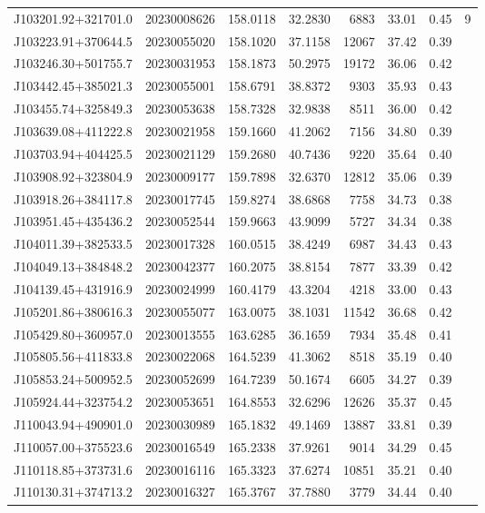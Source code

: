 \documentclass{article}
\begin{document}
\begin {longtable}{|l|l|r|r|r|r|r|l|}
 J103201.92+321701.0&  20230008626&  158.0118&   32.2830&  6883& 33.01& 0.45&9\\
 J103223.91+370644.5&  20230055020&  158.1020&   37.1158& 12067& 37.42& 0.39&\\
 J103246.30+501755.7&  20230031953&  158.1873&   50.2975& 19172& 36.06& 0.42&\\
 J103442.45+385021.3&  20230055001&  158.6791&   38.8372&  9303& 35.93& 0.43&\\
 J103455.74+325849.3&  20230053638&  158.7328&   32.9838&  8511& 36.00& 0.42&\\
 J103639.08+411222.8&  20230021958&  159.1660&   41.2062&  7156& 34.80& 0.39&\\
 J103703.94+404425.5&  20230021129&  159.2680&   40.7436&  9220& 35.64& 0.40&\\
 J103908.92+323804.9&  20230009177&  159.7898&   32.6370& 12812& 35.06& 0.39&\\
 J103918.26+384117.8&  20230017745&  159.8274&   38.6868&  7758& 34.73& 0.38&\\
 J103951.45+435436.2&  20230052544&  159.9663&   43.9099&  5727& 34.34& 0.38&\\
 J104011.39+382533.5&  20230017328&  160.0515&   38.4249&  6987& 34.43& 0.43&\\
 J104049.13+384848.2&  20230042377&  160.2075&   38.8154&  7877& 33.39& 0.42&\\
 J104139.45+431916.9&  20230024999&  160.4179&   43.3204&  4218& 33.00& 0.43&\\
 J105201.86+380616.3&  20230055077&  163.0075&   38.1031& 11542& 36.68& 0.42&\\
 J105429.80+360957.0&  20230013555&  163.6285&   36.1659&  7934& 35.48& 0.41&\\
 J105805.56+411833.8&  20230022068&  164.5239&   41.3062&  8518& 35.19& 0.40&\\
 J105853.24+500952.5&  20230052699&  164.7239&   50.1674&  6605& 34.27& 0.39&\\
 J105924.44+323754.2&  20230053651&  164.8553&   32.6296& 12626& 35.37& 0.45&\\
 J110043.94+490901.0&  20230030989&  165.1832&   49.1469& 13887& 33.81& 0.39&\\
 J110057.00+375523.6&  20230016549&  165.2338&   37.9261&  9014& 34.29& 0.45&\\
 J110118.85+373731.6&  20230016116&  165.3323&   37.6274& 10851& 35.21& 0.40&\\
 J110130.31+374713.2&  20230016327&  165.3767&   37.7880&  3779& 34.44& 0.40&\\

\end{longtable}
\end{document}
